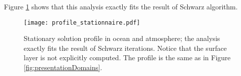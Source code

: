 Figure \ref{fig:validation} shows that this analysis exactly
fits the result of Schwarz algorithm.
\begin{figure}
    \centering
    \texttt{[image: profile\_stationnaire.pdf]}
    \caption{Stationary solution profile in ocean and atmosphere;
	the analysis exactly fits the result of Schwarz iterations.
	Notice that the surface layer is not explicitly computed.
	The profile is the same as in Figure \ref{fig:presentationDomains}.}
    \label{fig:validation}
\end{figure}

% 
